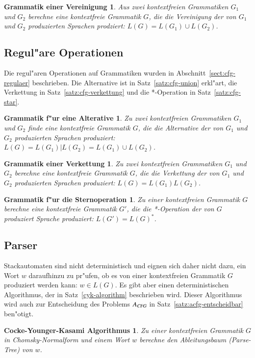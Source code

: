 \newtheorem*{CfgUnion}{Grammatik einer Vereinigung}
\begin{CfgUnion}
Aus zwei kontextfreien Grammatiken $G_1$ und $G_2$ berechne
eine kontextfreie Grammatik $G$, die die
Vereinigung der von $G_1$ und $G_2$ produzierten Sprachen prodziert:
$L(G)=L(G_1)\cup L(G_2)$.
\end{CfgUnion}

\subsection{Regul"are Operationen}
Die regul"aren Operationen auf Grammatiken wurden in
Abschnitt~\ref{sect:cfg-regulaer} beschrieben.
Die Alternative ist in Satz~\ref{satz:cfg-union} erkl"art,
die Verkettung in Satz~\ref{satz:cfg-verkettung} und die *-Operation
in Satz~\ref{satz:cfg-star}.

\newtheorem*{CfgAlternative}{Grammatik f"ur eine Alterative}
\begin{CfgAlternative}
Zu zwei kontextfreien Grammatiken $G_1$ und $G_2$ finde eine
kontextfreie Grammatik $G$, die die
Alternative der von $G_1$ und $G_2$ produzierten Sprachen produziert:
$L(G)=L(G_1)|L(G_2)=L(G_1)\cup L(G_2)$.
\end{CfgAlternative}

\newtheorem*{CfgConcatenation}{Grammatik einer Verkettung}
\begin{CfgConcatenation}
Zu zwei kontextfreien Grammatiken $G_1$ und $G_2$ berechne eine 
kontextfreie Grammatik $G$, die die Verkettung der von $G_1$ und $G_2$
produzierten Sprachen produziert: $L(G)=L(G_1)L(G_2)$.
\end{CfgConcatenation}

\newtheorem*{CfgStar}{Grammatik f"ur die Sternoperation}
\begin{CfgStar}
Zu einer kontextfreien Grammatik $G$ berechne eine kontextfreie Grammatik
$G'$, die die *-Operation der von $G$ produziert Sprache produziert:
$L(G')=L(G)^*$.
\end{CfgStar}

\subsection{Parser}
Stackautomaten sind nicht deterministisch und eignen sich daher nicht
dazu, ein Wort $w$ daraufhinzu zu pr"ufen, ob es von einer kontextfreien
Grammatik $G$ produziert werden kann: $w\in L(G)$. 
Es gibt aber einen deterministischen Algorithmus, der in
Satz~\ref{cyk-algorithm} beschrieben wird.
Dieser Algorithmus wird auch zur Entscheidung des Problems $A_\textsl{CFG}$
in Satz~\ref{satz:acfg-entscheidbar}
ben"otigt.

\newtheorem*{CYK}{Cocke-Younger-Kasami Algorithmus}
\begin{CYK}
Zu einer kontextfreien Grammatik $G$ in Chomsky-Normalform und einem
Wort $w$ berechne den Ableitungsbaum (Parse-Tree) von $w$.
\end{CYK}



